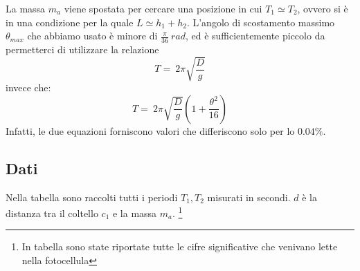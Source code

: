 La massa $m_a$ viene spostata per cercare una posizione in cui $T_1 \simeq T_2$, ovvero si è in una condizione per la quale $L\simeq h_1+h_2$. 
L'angolo di scostamento massimo $\theta_{max}$ che abbiamo usato è minore di $\frac{\pi}{36} \ rad$, ed è sufficientemente piccolo da permetterci di utilizzare la relazione 
$$ T = \ 2 \pi \sqrt{\frac{D}{g}}$$
invece che:
$$ T = \ 2 \pi \sqrt{\frac{D}{g}} \left( 1 + \frac{\theta^2}{16}\right)$$
Infatti, le due equazioni forniscono valori che differiscono solo per lo $0.04\% $.


\subsection{Dati}
Nella tabella sono raccolti tutti i periodi $T_1,T_2$ misurati in secondi. $d$ è la distanza tra il coltello $c_1$ e la massa $m_a$. \footnote{In tabella sono state riportate tutte le cifre significative che venivano lette nella fotocellula}
